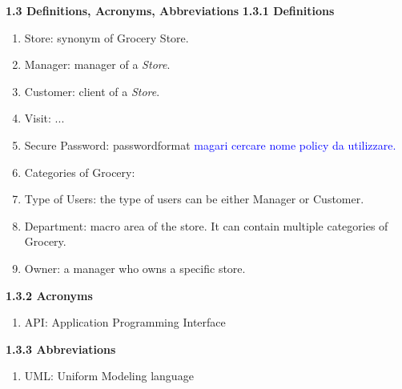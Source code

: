 \documentclass[a4paper, 10pt, oneside]{article}
\newcommand*{\lorenzo}[1]{\textcolor{BurntOrange}{#1}}
\newcommand{\giovanni}[1]{\textcolor{Blue}{#1}}
\begin{document}
\begin{itemize}
\begin{enumerate}[label={S.M.\arabic{*}}]
        
    \end{enumerate}
\end{itemize}


{\large \textbf{1.3 Definitions, Acronyms, Abbreviations}}
\newline \newline
\textbf{1.3.1 Definitions}

\begin{enumerate}[label={D.\arabic{*}}]
\item \label{def:store} Store: synonym of Grocery Store.
\item \label{def:manager} Manager: manager of a \textit{Store}. %
\item \label{def:customer} Customer: client of a \textit{Store}. %
\item \label{def:visit} Visit: ... %
\item \label{def:securepass} Secure Password: \lorenzo{passwordformat} \giovanni{magari cercare nome policy da utilizzare.}
\item \label{def:categoriesOfGroceries} Categories of Grocery:
\item \label{def:TypeOfUser}Type of Users: the type of users can be either Manager or Customer.
\item \label{def:department}Department: macro area of the store. It can contain multiple categories of Grocery.
\item \label{def:owner}Owner: a manager who owns a specific store.
\end{enumerate}

\textbf{1.3.2 Acronyms}
\begin{enumerate}[label={A.\arabic{*}}]
\item \label{def:API} API: Application Programming Interface
\end{enumerate}
\textbf{1.3.3 Abbreviations}
\begin{enumerate}[label={AB.\arabic{*}}]
\item \label{def:UML} UML: Uniform Modeling language
\end{enumerate}
\end{document}
